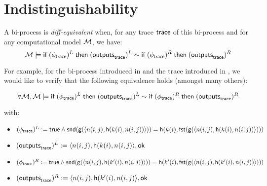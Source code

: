 \section{Indistinguishability}

\begin{definition}
  A bi-process is \emph{diff-equivalent} when, for any trace $\textsf{trace}$ of this bi-process and for any computational model $\mathcal{M}$, we have:
  $$\mathcal{M} \models \textsf{if}\; (\phi_{\textsf{trace}})^L \;\textsf{then}\; (\textsf{outputs}_{\textsf{trace}})^L \sim \textsf{if}\; (\phi_{\textsf{trace}})^R \;\textsf{then}\; (\textsf{outputs}_{\textsf{trace}})^R$$
\end{definition}

\begin{example}
  For example, for the bi-process introduced in  and the trace introduced in , we would like to verify that the following equivalence holds (amongst many others):

  $$\forall \mathcal{M}, \mathcal{M} \models \textsf{if}\; (\phi_{\textsf{trace}})^L \;\textsf{then}\; (\textsf{outputs}_{\textsf{trace}})^L \sim \textsf{if}\; (\phi_{\textsf{trace}})^R \;\textsf{then}\; (\textsf{outputs}_{\textsf{trace}})^R$$

  with:
  \begin{itemize}
    \item $(\phi_{\textsf{trace}})^L := \textsf{true} \land \mathsf{snd}(\mathsf{g}(\langle n(i,j), \mathsf{h}(k(i),n(i,j)) \rangle)) = \mathsf{h}( k(i), \mathsf{fst}( \mathsf{g}( \langle n(i,j), \mathsf{h}(k(i),n(i,j)) \rangle ))) $
    \item $(\textsf{outputs}_{\textsf{trace}})^L := \langle n(i,j), \mathsf{h}(k(i),n(i,j) \rangle, \mathsf{ok}$
    \item $(\phi_{\textsf{trace}})^R := \textsf{true} \land \mathsf{snd}(\mathsf{g}(\langle n(i,j), \mathsf{h}(k'(i),n(i,j)) \rangle)) = \mathsf{h}( k'(i), \mathsf{fst}( \mathsf{g}( \langle n(i,j), \mathsf{h}(k'(i),n(i,j)) \rangle ))) $
    \item $(\textsf{outputs}_{\textsf{trace}})^R := \langle n(i,j), \mathsf{h}(k'(i),n(i,j) \rangle, \mathsf{ok}$
  \end{itemize}
\end{example}
